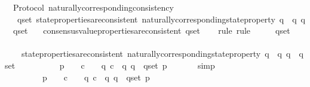 \begin{isabellebody}
\isanewline
\isanewline
{}\isamarkupfalse%
\ {\isacharparenleft}\ Protocol{\isacharparenright}\ naturally{\isacharunderscore}corresponding{\isacharunderscore}consistency\ {\isacharcolon}\isanewline
\ \ {\isachardoublequoteopen}{\isasymforall}\ q{\isacharunderscore}set{\isachardot}\ state{\isacharunderscore}properties{\isacharunderscore}are{\isacharunderscore}consistent\ {\isacharbraceleft}naturally{\isacharunderscore}corresponding{\isacharunderscore}state{\isacharunderscore}property\ q\ {\isacharbar}\ q{\isachardot}\ q\ {\isasymin}\ q{\isacharunderscore}set{\isacharbraceright}\isanewline
\ \ {\isasymlongrightarrow}\ consensus{\isacharunderscore}value{\isacharunderscore}properties{\isacharunderscore}are{\isacharunderscore}consistent\ q{\isacharunderscore}set{\isachardoublequoteclose}\isanewline
%
\isadelimproof
\ \ %
\endisadelimproof
%
\isatagproof
{}\isamarkupfalse%
\ {\isacharparenleft}rule{\isacharcomma}\ rule{\isacharparenright}\isanewline
{}\isamarkupfalse%
\ {\isacharminus}\isanewline
\ \ \isamarkupfalse%
\ q{\isacharunderscore}set\isanewline
\isanewline
\ \ \isamarkupfalse%
\ \isanewline
\ \ \ \ {\isachardoublequoteopen}state{\isacharunderscore}properties{\isacharunderscore}are{\isacharunderscore}consistent\ {\isacharbraceleft}naturally{\isacharunderscore}corresponding{\isacharunderscore}state{\isacharunderscore}property\ q\ {\isacharbar}\ q{\isachardot}\ q\ {\isasymin}\ q{\isacharunderscore}set{\isacharbraceright}\isanewline
\ \ \ \ {\isasymlongrightarrow}\ {\isacharparenleft}{\isasymexists}\ {\isasymsigma}\ {\isasymin}\ {\isasymSigma}{\isachardot}\ {\isasymforall}\ p\ {\isasymin}\ {\isacharbraceleft}{\isasymlambda}{\isasymsigma}{\isacharprime}{\isachardot}\ {\isasymforall}\ c\ {\isasymin}\ {\isasymepsilon}\ {\isasymsigma}{\isacharprime}{\isachardot}\ q\ c\ {\isacharbar}\ q{\isachardot}\ q\ {\isasymin}\ q{\isacharunderscore}set{\isacharbraceright}{\isachardot}\ p\ {\isasymsigma}{\isacharparenright}{\isachardoublequoteclose}\isanewline
\ \ \ \ \isamarkupfalse%
\ simp\isanewline
\ \ \isamarkupfalse%
\ \isamarkupfalse%
\isanewline
\ \ \ \ {\isachardoublequoteopen}{\isacharparenleft}{\isasymexists}\ {\isasymsigma}\ {\isasymin}\ {\isasymSigma}{\isachardot}\ {\isasymforall}\ p\ {\isasymin}\ {\isacharbraceleft}{\isasymlambda}{\isasymsigma}{\isacharprime}{\isachardot}\ {\isasymforall}\ c\ {\isasymin}\ {\isasymepsilon}\ {\isasymsigma}{\isacharprime}{\isachardot}\ q\ c\ {\isacharbar}\ q{\isachardot}\ q\ {\isasymin}\ q{\isacharunderscore}set{\isacharbraceright}{\isachardot}\ p\ {\isasymsigma}{\isacharparenright}\isanewline

\end{isabellebody}
